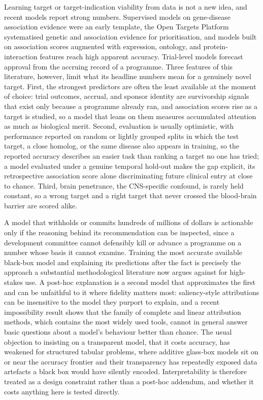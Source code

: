 \documentclass[11pt,twocolumn]{article}
\begin{document}
Learning target or target-indication viability from data is not a new idea, and recent models report strong numbers. Supervised models on gene-disease association evidence were an early template,\cite{ref29} the Open Targets Platform systematised genetic and association evidence for prioritisation,\cite{ref30} and models built on association scores augmented with expression, ontology, and protein-interaction features reach high apparent accuracy.\cite{ref31} Trial-level models forecast approval from the accruing record of a programme.\cite{ref32,ref33} Three features of this literature, however, limit what its headline numbers mean for a genuinely novel target. First, the strongest predictors are often the least available at the moment of choice: trial outcomes, accrual, and sponsor identity are survivorship signals that exist only because a programme already ran, and association scores rise as a target is studied, so a model that leans on them measures accumulated attention as much as biological merit. Second, evaluation is usually optimistic, with performance reported on random or lightly grouped splits in which the test target, a close homolog, or the same disease also appears in training, so the reported accuracy describes an easier task than ranking a target no one has tried; a model evaluated under a genuine temporal hold-out makes the gap explicit, its retrospective association score alone discriminating future clinical entry at close to chance.\cite{ref34} Third, brain penetrance, the CNS-specific confound, is rarely held constant, so a wrong target and a right target that never crossed the blood-brain barrier are scored alike.

A model that withholds or commits hundreds of millions of dollars is actionable only if the reasoning behind its recommendation can be inspected, since a development committee cannot defensibly kill or advance a programme on a number whose basis it cannot examine. Training the most accurate available black-box model and explaining its predictions after the fact is precisely the approach a substantial methodological literature now argues against for high-stakes use.\cite{ref35} A post-hoc explanation is a second model that approximates the first and can be unfaithful to it where fidelity matters most: saliency-style attributions can be insensitive to the model they purport to explain,\cite{ref36} and a recent impossibility result shows that the family of complete and linear attribution methods, which contains the most widely used tools, cannot in general answer basic questions about a model's behaviour better than chance.\cite{ref37} The usual objection to insisting on a transparent model, that it costs accuracy, has weakened for structured tabular problems, where additive glass-box models sit on or near the accuracy frontier and their transparency has repeatedly exposed data artefacts a black box would have silently encoded.\cite{ref38,ref39} Interpretability is therefore treated as a design constraint rather than a post-hoc addendum, and whether it costs anything here is tested directly.
\end{document}
